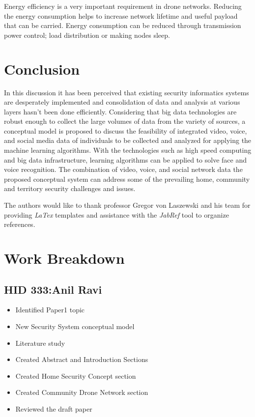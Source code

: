 \documentclass[sigconf]{acmart}
\begin{document}
Energy efficiency is a very important requirement in drone networks. Reducing the energy consumption helps to increase network lifetime and useful payload that can be carried. Energy consumption can be reduced through transmission power control; load distribution or making nodes sleep\cite{Gupta2015}.


\section{Conclusion}
In this discussion it has been perceived that existing security informatics systems are desperately implemented and consolidation of data and analysis at various layers hasn't been done efficiently. Considering that big data technologies are robust enough to collect the large volumes of data from the variety of sources, a conceptual model is proposed to discuss the feasibility of integrated video, voice, and social media data of individuals to be collected and analyzed for applying the machine learning algorithms. With the technologies such as high speed computing and big data infrastructure, learning algorithms can be applied to solve face and voice recognition. The combination of video, voice, and social network data the proposed conceptual system can address some of the prevailing home, community and territory security challenges and issues.

\begin{acks}
The authors would like to thank professor Gregor von Laszewski and his team for providing \textit{LaTex} templates and assistance with the \textit{JabRef} tool to organize references.
\end{acks}


 

\appendix
\section{Work Breakdown}
\subsection{HID 333:Anil Ravi}
\begin{itemize}
  \item Identified Paper1 topic
  \item New Security System conceptual model 
  \item Literature study
  \item Created Abstract and Introduction Sections
  \item Created Home Security Concept section
  \item Created Community Drone Network section
  \item Reviewed the draft paper
\end{itemize}
\end{document}
